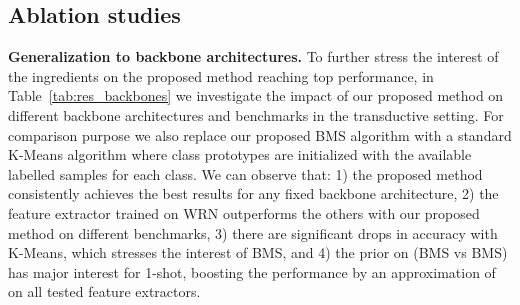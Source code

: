 \documentclass[review]{elsarticle}
\begin{document}
\begin{table}[h!]
    \caption{1-shot and 5-shot accuracy of state-of-the-art methods when performing cross-domain classification (backbone: WRN).}
    \centering
    \label{tab:results_cross}
\end{table}

\subsection{Ablation studies}

\textbf{Generalization to backbone architectures.} To further stress the interest of the ingredients on the proposed method reaching top performance, in Table~\ref{tab:res_backbones} we investigate the impact of our proposed method on different backbone architectures and benchmarks in the transductive setting. For comparison purpose we also replace our proposed BMS algorithm with a standard K-Means algorithm where class prototypes are initialized with the available labelled samples for each class. We can observe that: 1) the proposed method consistently achieves the best results for any fixed backbone architecture, 2) the feature extractor trained on WRN outperforms the others with our proposed method on different benchmarks, 3) there are significant drops in accuracy with K-Means, which stresses the interest of BMS, and 4) the prior on  (BMS vs BMS) has major interest for 1-shot, boosting the performance by an approximation of  on all tested feature extractors.
\end{document}
